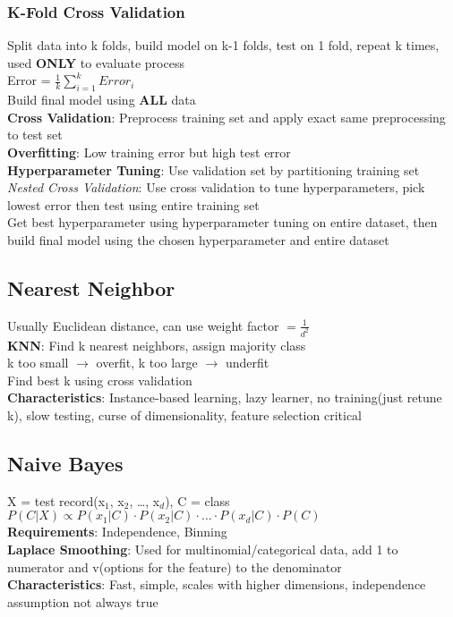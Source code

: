\documentclass{article}
\begin{document}
\begin{multicols*}{2}
        \subsubsection*{K-Fold Cross Validation}
        Split data into k folds, build model on k-1 folds, test on 1 fold, repeat k times, used
        \textbf{ONLY} to evaluate process\\
        Error = $\frac{1}{k} \sum_{i=1}^{k} Error_i$\\
        Build final model using \textbf{ALL} data\\
        \textbf{Cross Validation}: Preprocess training set and apply exact same preprocessing to
        test set\\
        \textbf{Overfitting}: Low training error but high test error\\
        \textbf{Hyperparameter Tuning}: Use validation set by partitioning training set\\
        \textit{Nested Cross Validation}: Use cross validation to tune hyperparameters, pick
        lowest error then test using entire training set\\
        Get best hyperparameter using hyperparameter tuning on entire dataset, then build final
        model using the chosen hyperparameter and entire dataset\\
        \subsection*{Nearest Neighbor}
        Usually Euclidean distance, can use weight factor $= \frac{1}{d^2}$\\
        \textbf{KNN}: Find k nearest neighbors, assign majority class\\
        k too small $\to$ overfit, k too large $\to$ underfit\\
        Find best k using cross validation\\
        \textbf{Characteristics}: Instance-based learning, lazy learner, no training(just retune
        k), slow testing, curse of dimensionality, feature selection critical\\
        \subsection*{Naive Bayes}
        X = test record(x$_1$, x$_2$, \ldots, x$_d$), C = class\\
        $P(C|X) \propto P(x_1|C) \cdot P(x_2|C) \cdot \ldots \cdot P(x_d|C) \cdot P(C)$\\
        \textbf{Requirements}: Independence, Binning\\
        \textbf{Laplace Smoothing}: Used for multinomial/categorical data, add 1 to numerator and
        v(options for the feature) to the denominator\\
        \textbf{Characteristics}: Fast, simple, scales with higher dimensions, independence
        assumption not always true\\

\end{multicols*}
\end{document}
